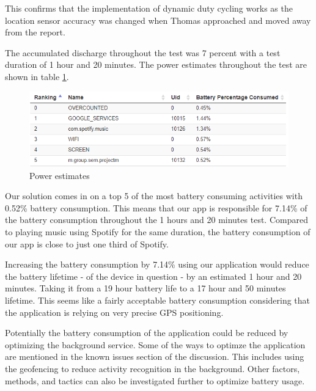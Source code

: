 This confirms that the implementation of dynamic duty cycling works as the location sensor accuracy was changed when Thomas approached and moved away from the report. 

The accumulated discharge throughout the test was 7 percent with a test duration of 1 hour and 20 minutes. The power estimates throughout the test are shown in table \ref{fig:power_estimates}.


\begin{figure}[H]
\centering
\includegraphics[width=\linewidth]{images/powerestimates}
\caption{Power estimates} 
\label{fig:power_estimates}
\end{figure}

Our solution comes in on a top 5 of the most battery consuming activities with 0.52\% battery consumption. This means that our app is responsible for 7.14\% of the battery consumption throughout the 1 hours and 20 minutes test. Compared to playing music using Spotify for the same duration, the battery consumption of our app is close to just one third of Spotify. 

Increasing the battery consumption by 7.14\% using our application would reduce the battery lifetime - of the device in question - by an estimated 1 hour and 20 minutes. Taking it from a 19 hour battery life to a 17 hour and 50 minutes lifetime. This seems like a fairly acceptable battery consumption considering that the application is relying on very precise GPS positioning. 

Potentially the battery consumption of the application could be reduced by optimizing the background service. Some of the ways to optimze the application are mentioned in the known issues section of the discussion. This includes using the geofencing to reduce activity recognition in the background. Other factors, methods, and tactics can also be investigated further to optimize battery usage.